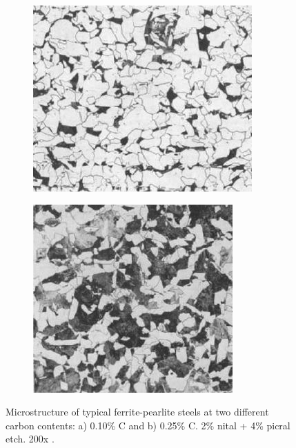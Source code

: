 \documentclass[12pt]{report}
\begin{document}
\begin{figure}[H]

\centering
\begin{subfigure}{.45\textwidth}
    \centering
    \includegraphics[height=.95\textwidth, width=\textwidth]{ferrite-pearlite_carbon_content_1.jpg}
    \caption{}
\end{subfigure}
\begin{subfigure}{.45\textwidth}
    \centering
    \includegraphics[height=.95\textwidth, width=\textwidth]{ferrite-pearlite_carbon_content_2.jpg}
    \caption{}
\end{subfigure}

\caption{Microstructure of typical ferrite-pearlite steels at two different carbon contents: a) 0.10\% C and b) 0.25\% C. 2\% nital + 4\% picral etch. 200x \cite{molabe2018determining}.}
\label{ch3:figure:contents}
\end{figure}
 
\end{document}
